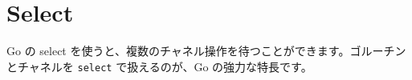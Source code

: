 \section{Select}

Go の select を使うと、複数のチャネル操作を待つことができます。ゴルーチンとチャネルを \texttt{select} で扱えるのが、Go の強力な特長です。




